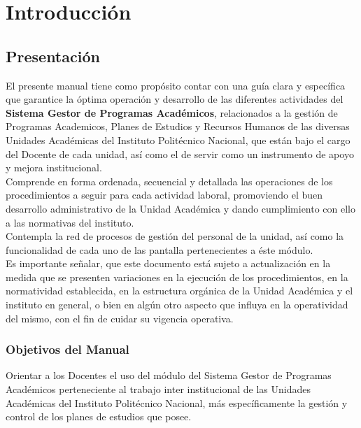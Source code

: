 \chapter{Introducción}


\section{Presentación}
El presente manual tiene como propósito contar con una guía clara y específica que garantice la óptima operación y desarrollo de las diferentes actividades del \textbf{Sistema Gestor de Programas Académicos}, relacionados a la gestión de Programas Academicos, Planes de Estudios y Recursos Humanos de las diversas Unidades Académicas del Instituto Politécnico Nacional, que están bajo el cargo del Docente de cada unidad, así como el de servir como un instrumento de apoyo y mejora institucional.\\

Comprende en forma ordenada, secuencial y detallada las operaciones de los procedimientos a seguir para cada actividad laboral, promoviendo el buen desarrollo administrativo de la Unidad Académica y dando cumplimiento con ello a las normativas del instituto.\\

Contempla la red de procesos de gestión del personal de la unidad, así como la funcionalidad de cada uno de las pantalla pertenecientes a éste módulo.\\

Es importante señalar, que este documento está sujeto a actualización en la medida que se presenten variaciones en la ejecución de los procedimientos, en la normatividad establecida, en la estructura orgánica de la Unidad Académica y el instituto en general, o bien en algún otro aspecto que influya en la operatividad del mismo, con el fin de cuidar su vigencia operativa.

\subsection{Objetivos del Manual}
Orientar a los Docentes el uso del módulo del Sistema Gestor de Programas Académicos perteneciente al trabajo inter institucional de las Unidades Académicas del Instituto Politécnico Nacional, más específicamente la gestión y control de los planes de estudios que posee.

